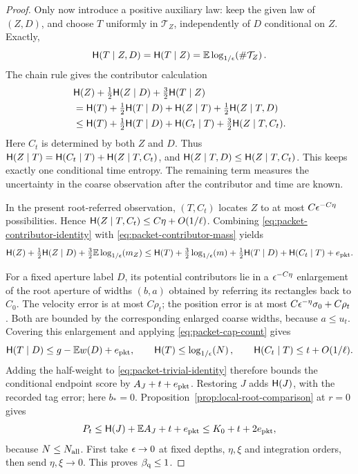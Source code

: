 \begin{proof}
Only now introduce a positive auxiliary law: keep the given law
of \((Z,D)\), and choose \(T\) uniformly in \(\mathcal T_Z\),
independently of \(D\) conditional on \(Z\).  Exactly,
\[
 \mathsf H(T\mid Z,D)=\mathsf H(T\mid Z)
  =\mathbb E\log_{1/\epsilon}\!\left(\#\mathcal T_Z\right).
\]
The chain rule gives the contributor calculation
\begin{align}
 &\mathsf H(Z)+\tfrac12\mathsf H(Z\mid D)
                      +\tfrac32\mathsf H(T\mid Z)\nonumber\\
 &=\mathsf H(T)+\tfrac12\mathsf H(T\mid D)
                  +\mathsf H(Z\mid T)+\tfrac12\mathsf H(Z\mid T,D)\nonumber\\
 &\le\mathsf H(T)+\tfrac12\mathsf H(T\mid D)+\mathsf H(C_t\mid T)
                     +\tfrac32\mathsf H(Z\mid T,C_t).
 \label{eq:packet-contributor-identity}
\end{align}
Here \(C_t\) is determined by both \(Z\) and \(D\).  Thus
\(\mathsf H(Z\mid T)=\mathsf H(C_t\mid T)+\mathsf H(Z\mid T,C_t)\), and
\(\mathsf H(Z\mid T,D)\le\mathsf H(Z\mid T,C_t)\).
This keeps exactly one conditional time entropy.  The remaining
term measures the uncertainty in the coarse observation after the
contributor and time are known.

In the present root-referred observation, \((T,C_t)\) locates \(Z\)
to at most \(C\epsilon^{-C\eta}\) possibilities.  Hence
\(\mathsf H(Z\mid T,C_t)\le C\eta+O(1/\ell)\).
Combining \eqref{eq:packet-contributor-identity} with
\eqref{eq:packet-contributor-mass} yields
\begin{equation}
 \mathsf H(Z)+\tfrac12\mathsf H(Z\mid D)+\tfrac32\mathbb E\log_{1/\epsilon}\!\left(m_Z\right)
 \le\mathsf H(T)+\tfrac32\log_{1/\epsilon}\!\left(m\right)+
       \tfrac12\mathsf H(T\mid D)+\mathsf H(C_t\mid T)+e_{\rm pkt}.
 \label{eq:packet-trivial-identity}
\end{equation}

For a fixed aperture label \(D\), its potential contributors lie
in a \(\epsilon^{-C\eta}\) enlargement of the root aperture of widths
\((b,a)\) obtained by referring its rectangles back to \(C_0\).
The velocity error is at most \(C\rho_t\); the position error is
at most \(C\epsilon^{-\eta}\sigma_0+C\rho_t\).  Both are bounded
by the corresponding enlarged coarse widths, because \(a\le u_t\).
Covering this enlargement and applying
\eqref{eq:packet-cap-count} gives
\[
 \mathsf H(T\mid D)\le g-\mathbb E w(D)+e_{\rm pkt},\qquad
 \mathsf H(T)\le\log_{1/\epsilon}\!\left(N\right),\qquad
 \mathsf H(C_t\mid T)\le t+O(1/\ell).
\]
Adding the half-weight to \eqref{eq:packet-trivial-identity}
therefore bounds the conditional endpoint score by
\(A_J+t+e_{\rm pkt}\).  Restoring \(J\) adds
\(\mathsf H(J)\), with the recorded tag error; here \(b_*=0\).
Proposition~\ref{prop:local-root-comparison} at \(r=0\) gives
\[
 P_t\le\mathsf H(J)+\mathbb E A_J+t+e_{\rm pkt}
 \le K_0+t+2e_{\rm pkt},
\]
because \(N\le N_{\rm all}\).  First take \(\epsilon\to0\) at fixed
depths, \(\eta,\xi\) and integration orders, then send
\(\eta,\xi\to0\).  This proves \(\beta_{\mathrm q}\le1\).
\end{proof}
